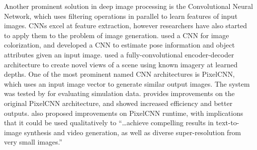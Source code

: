 \documentclass{article}
\begin{document}
Another prominent solution in deep image processing is
the Convolutional Neural Network, which uses filtering operations
in parallel to learn features of input images.
CNNs excel at feature extraction, however researchers have also started to
apply them to the problem of image generation.
\cite{deep_colorization} used a CNN for image colorization, and
\cite{posecnn} developed a CNN to estimate pose information
and object attributes given an input image.
\cite{multiplane} used a fully-convolutional encoder-decoder architecture to
create novel views of a scene using known imagery at learned depths.
One of the most prominent named CNN architectures is PixelCNN,
which uses an input image vector to generate similar output images.
The system was tested by \cite{comparing_simulations} for evaluating simulation
data. \cite{pixelcnn++} provides improvements on the original
PixelCNN architecture, and showed increased efficiency and better outputs.
\cite{parallel_multiscale} also proposed improvements on PixelCNN runtime,
with implications that it could be used qualitatively to
``\dots achieve compelling results in text-to-image synthesis and
video generation, as well as diverse super-resolution from very small images.''
\end{document}
